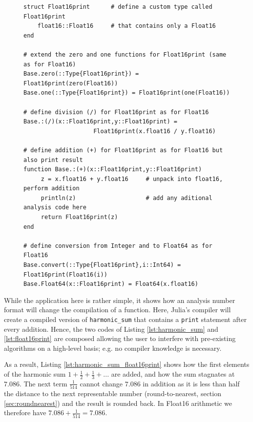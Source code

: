\begin{figure}[tbhp]
\begin{lstlisting}[language=JuliaLocal, label=lst:float16print, caption={\textbf{Minimal example of the definition of a new custom analysis
number format \texttt{Float16print} in Julia.} The number format behaves like Float16 and defines all operations needed for \texttt{harmonic\_sum}
but the addition is extended with a \texttt{print} statement that helps to analyse code without changing \texttt{harmonic\_sum} itself.}]
struct Float16print      # define a custom type called Float16print
    float16::Float16     # that contains only a Float16
end

# extend the zero and one functions for Float16print (same as for Float16)
Base.zero(::Type{Float16print}) = Float16print(zero(Float16))
Base.one(::Type{Float16print}) = Float16print(one(Float16))

# define division (/) for Float16print as for Float16
Base.:(/)(x::Float16print,y::Float16print) =
					Float16print(x.float16 / y.float16)

# define addition (+) for Float16print as for Float16 but also print result
function Base.:(+)(x::Float16print,y::Float16print)
     z = x.float16 + y.float16     # unpack into float16, perform addition
     println(z)                    # add any aditional analysis code here
     return Float16print(z)
end

# define conversion from Integer and to Float64 as for Float16
Base.convert(::Type{Float16print},i::Int64) = Float16print(Float16(i))
Base.Float64(x::Float16print) = Float64(x.float16)
\end{lstlisting}
\end{figure}

While the application here is rather simple, it shows how an analysis number format will change the compilation of a function. Here,
Julia's compiler will create a compiled version of \texttt{harmonic\_sum} that contains a \texttt{print} statement after
every addition. Hence, the two codes of Listing \ref{lst:harmonic_sum} and \ref{lst:float16print} are composed allowing the user
to interfere with pre-existing algorithms on a high-level basis; e.g. no compiler knowledge is necessary.

As a result, Listing \ref{lst:harmonic_sum_float16print} shows how the first elements of the harmonic sum $1 + \tfrac{1}{2} + \tfrac{1}{3} + ...$ are added,
and how the sum stagnates at $7.086$. The next term $\tfrac{1}{514}$ cannot change $7.086$ in addition as it is less than half the
distance to the next representable number (round-to-nearest, section \ref{sec:roundnearest}) and the result is rounded back.
In Float16 arithmetic we therefore have $7.086 + \tfrac{1}{514} = 7.086$.

